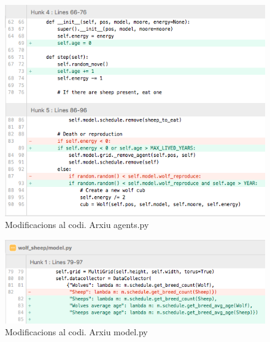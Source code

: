 \documentclass{article} %
\begin{document}
{	\begin{figure}[H]
		\begin{changemargin}{-1cm}{0.5cm}
			\includegraphics[width=14cm]{code/agents_2}
			\centering
			\color{blue}
			\caption{Modificacions al codi. Arxiu agents.py}\label{visina8}
		\end{changemargin}
	\end{figure}

	\begin{figure}[H]
		\begin{changemargin}{-1cm}{0.5cm}
			\includegraphics[width=14cm]{code/model}
			\centering
			\color{blue}
			\caption{Modificacions al codi. Arxiu model.py}\label{visina8}
		\end{changemargin}
	\end{figure}

}
\end{document}
